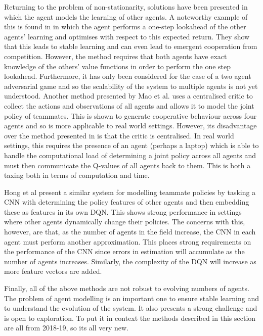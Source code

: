\documentclass[preprint,11pt]{report}
\begin{document}
Returning to the problem of non-stationarity, solutions have been presented in which the agent
models the learning of other agents. A noteworthy example of this is found in
\cite{Foerster2018LearningAwareness} in which the agent performs a one-step lookahead of the other
agents' learning and optimises with respect to this expected return. They show that this leads to
stable learning and can even lead to emergent cooperation from competition. However, the method
requires that both agents have exact knowledge of the others' value functions in order to perform
the one step lookahead. Furthermore, it has only been considered for the case of a two agent
adversarial game and so the scalability of the system to multiple agents is not yet understood.
Another method presented by Mao et al. \cite{MaoModellingDDPG} uses a centralised critic to collect
the actions and observations of all agents and allows it to model the joint policy of teammates.
This is shown to generate cooperative behaviour across four agents and so is more applicable to real
world settings. However, its disadvantage over the method presented in
\cite{Foerster2018LearningAwareness} is that the critic is centralised. In real world settings, this
requires the presence of an agent (perhaps a laptop) which is able to handle the computational load
of determining a joint policy across all agents and must then communicate the Q-values of all agents
back to them. This is both a taxing both in terms of computation and time. 

Hong et al \cite{Hong2018ASystems} present a similar system for modelling teammate policies by
tasking a CNN with determining the policy features of other agents and then embedding these as
features in its own DQN. This shows strong performance in settings where other agents dynamically
change their policies. The concerns with this, however, are that, as the number of agents in the
field increase, the CNN in each agent must perform another approximation. This places strong
requirements on the performance of the CNN since errors in estimation will accumulate as the number
of agents increases. Similarly, the complexity of the DQN will increase as more feature vectors are
added. 

Finally, all of the above methods are not robust to evolving numbers of agents. The problem of agent
modelling is an important one to ensure stable learning and to understand the evolution of the
system. It also presents a strong challenge and is open to exploration. To put it in context the
methods described in this section are all from 2018-19, so its all very new.
\end{document}
